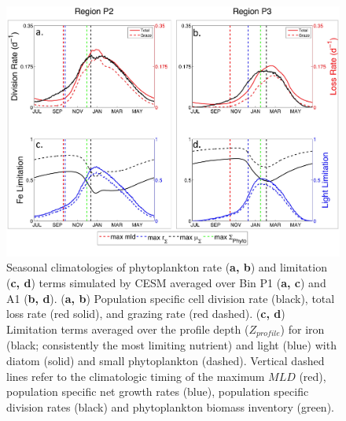 \begin{figure}[!htbp]
\begin{adjustwidth}{-1in}{-1in}
 \centering
 \includegraphics[scale=.18]{figures/Ch2/Figure_6.jpg}
\end{adjustwidth}
\caption[Simulated seasonal climatologies of phytoplankton rate and limitation terms; Bin P1, P2, and P3]{Seasonal climatologies of phytoplankton rate (\textbf{a, b}) and limitation (\textbf{c, d}) terms simulated by CESM averaged over Bin P1 (\textbf{a, c}) and A1 (\textbf{b, d}). (\textbf{a, b}) Population specific cell division rate (black), total loss rate (red solid), and grazing rate (red dashed). (\textbf{c, d}) Limitation terms averaged over the profile depth ($Z_{profile}$) for iron (black; consistently the most limiting nutrient) and light (blue) with diatom (solid) and small phytoplankton (dashed). Vertical dashed lines refer to the climatologic timing of the maximum $MLD$ (red), population specific net growth rates (blue), population specific division rates (black) and phytoplankton biomass inventory (green).}
\label{fig:Fig6}
\end{figure}


